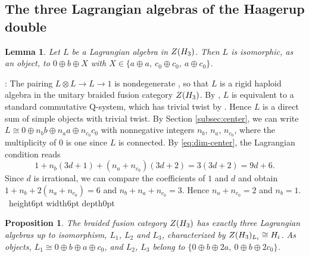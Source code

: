 \documentclass[leqno]{article}
\newcommand{\Q}{\mathrm{Q}}
\let\cal\relax
\newcommand{\cal}{\mathcal}
\newcommand{\qed}{\hfill \vrule height6pt  width6pt depth0pt}
\newcommand{\ot}{\otimes}
\newtheorem{prop}[thm]{Proposition}
\newtheorem{lemma}[thm]{Lemma}
\newenvironment{proof}[1][]{\noindent {\it Proof #1} : }{\hbox{~}\qed
\smallskip
}
\numberwithin{equation}{section}
\begin{document}
\subsection{The three Lagrangian algebras of the Haagerup double}

\begin{lemma}
\label{lem:possible-objects}
Let $L$ be a Lagrangian algebra in $Z(\cal H_3)$. Then $L$ is isomorphic, as an object, to $0 \oplus b \oplus X$ with $X \in \{a \oplus a,\ c_0 \oplus c_0,\ a \oplus c_0\}$.
\end{lemma}

\begin{proof}
The pairing $L \ot L \to L \to 1$ is nondegenerate \cite[Remark 3.4 p.~7]{DMNO13}, so that $L$ is a rigid haploid algebra in the unitary braided fusion category $Z(\cal H_3)$. By \cite[Theorem 3.2 p.~11]{CGGH23}, $L$ is equivalent to a standard commutative $\Q$-system, which has trivial twist by \cite[Proposition 2.22 p.~9]{CGGH23}. Hence $L$ is a direct sum of simple objects with trivial twist. By Section \ref{subsec:center}, we can write $L \cong 0 \oplus n_b b \oplus n_a a \oplus n_{c_0}c_0$ with nonnegative integers $n_b$, $n_a$, $n_{c_0}$, where the multiplicity of $0$ is one since $L$ is connected. By \eqref{eq:dim-center}, the Lagrangian condition reads
\[
1 + n_b(3d+1) + (n_a+n_{c_0})(3d+2) = 3(3d+2) = 9d+6.
\]
Since $d$ is irrational, we can compare the coefficients of $1$ and $d$ and obtain $1+n_b+2(n_a+n_{c_0}) = 6$ and $n_b+n_a+n_{c_0} = 3$. Hence $n_a+n_{c_0} = 2$ and $n_b = 1$.
\end{proof}

\begin{prop}
\label{prop:three-lagrangian}
The braided fusion category $Z(\cal H_3)$ has exactly three Lagrangian algebras up to isomorphism, $L_1$, $L_2$ and $L_3$, characterized by $Z(\cal H_3)_{L_i} \cong \cal H_i$. As objects, $L_1 \cong 0 \oplus b \oplus a \oplus c_0$, and $L_2$, $L_3$ belong to $\{0 \oplus b \oplus 2a,\ 0 \oplus b \oplus 2c_0\}$.
\end{prop}
\end{document}
